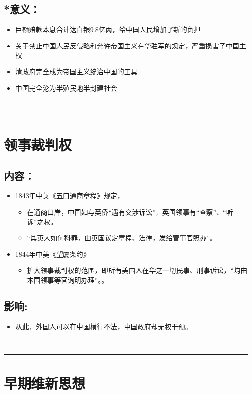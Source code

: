 \documentclass{article}
\begin{document}
\subsection*{*意义：}
\begin{itemize}
    \item 巨额赔款本息合计达白银9.8亿两，给中国人民增加了新的负担
    \item 关于禁止中国人民反侵略和允许帝国主义在华驻军的规定，严重损害了中国主权
    \item 清政府完全成为帝国主义统治中国的工具
    \item 中国完全沦为半殖民地半封建社会
\end{itemize}


\ \hrule

\section*{领事裁判权}
\subsection*{内容：}
\begin{itemize}
    \item 1843年中英《五口通商章程》规定，
    \begin{itemize}
        \item 在通商口岸，中国如与英侨“遇有交涉诉讼”，英国领事有“查察”、“听诉”之权。
        \item “其英人如何科罪，由英国议定章程、法律，发给管事官照办”。
    \end{itemize}
    \item 1844年中美《望厦条约》
    \begin{itemize}
        \item 扩大领事裁判权的范围，即所有美国人在华之一切民事、刑事诉讼，“均由本国领事等官询明办理”。。
    \end{itemize}
\end{itemize}
\subsection*{影响:}

\begin{itemize}
	\item 从此，外国人可以在中国横行不法，中国政府却无权干预。
\end{itemize}
\ \hrule

\section*{早期维新思想}
\end{document}
